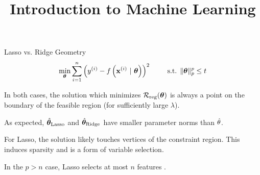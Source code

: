 \documentclass[11pt,compress,t,notes=noshow, xcolor=table]{beamer}
\title{Introduction to Machine Learning}
\date{}
\begin{document}
 

\begin{vbframe}{Lasso vs. Ridge Geometry}
$$ 
  \min_{\bm{\theta}} \sum\limits_{i=1}^n \left(y^{(i)} - f\left(\mathbf{x}^{(i)} ~|~ \bm{\theta}\right)\right)^2 \qquad \text{ s.t. } \|\bm{\theta}\|_p^p  \leq t 
$$ 
  \vspace{-0.5cm}
  \begin{figure}
    \centering
  \end{figure}

  \begin{itemize}
    \item \small{In both cases, the solution which minimizes $\mathcal{R}_{\text{reg}}(\bm{\theta})$ is always a point on the boundary of the feasible region (for sufficiently large $\lambda$).
    \item As expected, $\hat{\bm{\theta}}_{\text{Lasso}}$ and $\hat{\bm{\theta}}_{\text{Ridge}}$ have smaller parameter norms than $\hat{\theta}$.}
    \item For Lasso, the solution likely touches vertices of the constraint region. This induces sparsity and is a form of variable selection.
    \item In the $p>n$ case, Lasso selects at most $n$ features .
    
  \end{itemize}
  
\end{vbframe}
\end{document}
